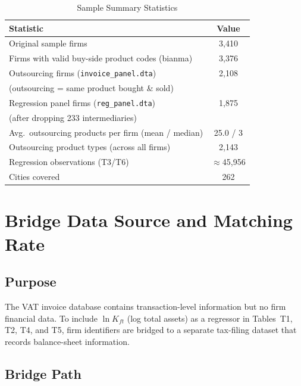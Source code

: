 \documentclass[12pt]{article}
\begin{document}
\begin{table}[H]
  \centering
  \caption{Sample Summary Statistics}
  \label{tab:sample_summary}
  \begin{tabular}{lc}
    \toprule
    Statistic & Value \\
    \midrule
    Original sample firms                                      & 3,410 \\
    Firms with valid buy-side product codes (bianma)           & 3,376 \\
    Outsourcing firms (\texttt{invoice\_panel.dta})            & 2,108 \\
    \quad (outsourcing = same product bought \& sold)          & \\
    Regression panel firms (\texttt{reg\_panel.dta})           & 1,875 \\
    \quad (after dropping 233 intermediaries)                  & \\
    Avg.\ outsourcing products per firm (mean / median)        & 25.0 / 3 \\
    Outsourcing product types (across all firms)               & 2,143 \\
    Regression observations (T3/T6)                            & $\approx$45,956 \\
    Cities covered                                             & 262 \\
    \bottomrule
  \end{tabular}
\end{table}

\section{Bridge Data Source and Matching Rate}
\label{sec:bridge}

\subsection*{Purpose}

The VAT invoice database contains transaction-level information but no firm
financial data. To include \(\ln K_{ft}\) (log total assets) as a regressor in
Tables~T1, T2, T4, and T5, firm identifiers are bridged to a separate tax-filing
dataset that records balance-sheet information.

\subsection*{Bridge Path}
\end{document}
